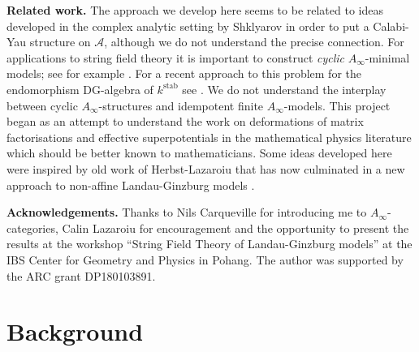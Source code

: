 \documentclass[english,letter paper,12pt,leqno]{article}
\theoremstyle{example}
\newtheorem{remark}[theorem]{Remark}
\numberwithin{equation}{section}
\def\AA{\mathcal{A}}
\def\stab{\operatorname{stab}}
\begin{document}
\textbf{Related work.} The approach we develop here seems to be related to ideas developed in the complex analytic setting by Shklyarov \cite{shklyarov_cy} in order to put a Calabi-Yau structure on $\AA$, although we do not understand the precise connection. For applications to string field theory it is important to construct \emph{cyclic} $A_\infty$-minimal models; see for example \cite{carqueville}. For a recent approach to this problem for the endomorphism DG-algebra of $k^{\stab}$ see \cite{tu}. We do not understand the interplay between cyclic $A_\infty$-structures and idempotent finite $A_\infty$-models. This project began as an attempt to understand the work on deformations of matrix factorisations and effective superpotentials in the mathematical physics literature \cite{baumgartl1, baumgartl2, baumgartl3, baumgartl4, carqueville2, carqueville3, knapp} which should be better known to mathematicians. Some ideas developed here were inspired by old work of Herbst-Lazaroiu \cite{herbst} that has now culminated in a new approach to non-affine Landau-Ginzburg models \cite{babalic}.

\vspace{0.3cm}

\textbf{Acknowledgements.} Thanks to Nils Carqueville for introducing me to $A_\infty$-categories, Calin Lazaroiu for encouragement and the opportunity to present the results at the workshop ``String Field Theory of Landau-Ginzburg models'' at the IBS Center for Geometry and Physics in Pohang. The author was supported by the ARC grant DP180103891.



\section{Background}
\end{document}
